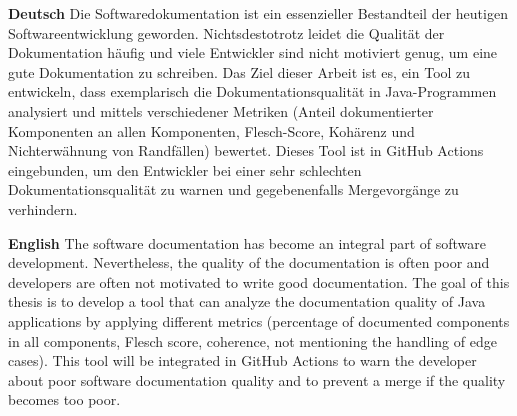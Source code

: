 \textbf{Deutsch}
Die Softwaredokumentation ist ein essenzieller Bestandteil der heutigen Softwareentwicklung geworden. Nichtsdestotrotz leidet die Qualität der Dokumentation häufig und viele Entwickler sind nicht motiviert genug, um eine gute Dokumentation zu schreiben. Das Ziel dieser Arbeit ist es, ein Tool zu entwickeln, dass exemplarisch die Dokumentationsqualität in Java-Programmen analysiert und mittels verschiedener Metriken (Anteil dokumentierter Komponenten an allen Komponenten, Flesch-Score, Kohärenz und Nichterwähnung von Randfällen) bewertet. Dieses Tool ist in GitHub Actions eingebunden, um den Entwickler bei einer sehr schlechten Dokumentationsqualität zu warnen und gegebenenfalls Mergevorgänge zu verhindern.

\bigskip

\noindent
\textbf{English} 
The software documentation has become an integral part of software development. Nevertheless, the quality of the documentation is often poor and developers are often not motivated to write good documentation. The goal of this thesis is to develop a tool that can analyze the documentation quality of Java applications by applying different metrics (percentage of documented components in all components, Flesch score, coherence, not mentioning the handling of edge cases). This tool will be integrated in GitHub Actions to warn the developer about poor software documentation quality and to prevent a merge if the quality becomes too poor.  

